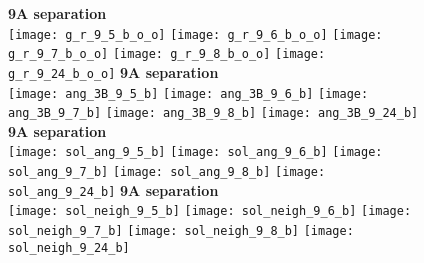 \documentclass[journal=acsnano,manuscript=article]{achemso}
\begin{document}
\begin{figure}[h!]
	\centering
	\textbf{9A separation} \\
	\texttt{[image: g\_r\_9\_5\_b\_o\_o]} 
	\texttt{[image: g\_r\_9\_6\_b\_o\_o]}
	\texttt{[image: g\_r\_9\_7\_b\_o\_o]}
	\texttt{[image: g\_r\_9\_8\_b\_o\_o]}
	\texttt{[image: g\_r\_9\_24\_b\_o\_o]}
	\textbf{9A separation} \\
	\texttt{[image: ang\_3B\_9\_5\_b]} 
	\texttt{[image: ang\_3B\_9\_6\_b]}
	\texttt{[image: ang\_3B\_9\_7\_b]}
	\texttt{[image: ang\_3B\_9\_8\_b]}
	\texttt{[image: ang\_3B\_9\_24\_b]}
	\textbf{9A separation} \\
	\texttt{[image: sol\_ang\_9\_5\_b]} 
	\texttt{[image: sol\_ang\_9\_6\_b]}
	\texttt{[image: sol\_ang\_9\_7\_b]}
	\texttt{[image: sol\_ang\_9\_8\_b]}
	\texttt{[image: sol\_ang\_9\_24\_b]}
	\textbf{9A separation} \\
	\texttt{[image: sol\_neigh\_9\_5\_b]} 
	\texttt{[image: sol\_neigh\_9\_6\_b]}
	\texttt{[image: sol\_neigh\_9\_7\_b]}
	\texttt{[image: sol\_neigh\_9\_8\_b]}
	\texttt{[image: sol\_neigh\_9\_24\_b]}
	\label{fig:gr_9extra}
\end{figure}
\end{document}
